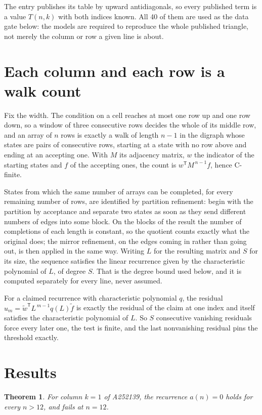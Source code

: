 \documentclass[11pt]{article}
\newtheorem{theorem}{Theorem}
\theoremstyle{definition}
\begin{document}
The entry publishes its table by upward antidiagonals, so every published term is a value $T(n,k)$ with both indices known. All 40 of them are used as the data gate below: the models are required to reproduce the whole published triangle, not merely the column or row a given line is about.

\section{Each column and each row is a walk count}

Fix the width. The condition on a cell reaches at most one row up and one row down, so a window of three consecutive rows decides the whole of its middle row, and an array of $n$ rows is exactly a walk of length $n-1$ in the digraph whose states are pairs of consecutive rows, starting at a state with no row above and ending at an accepting one. With $M$ its adjacency matrix, $w$ the indicator of the starting states and $f$ of the accepting ones, the count is $w^{\mathsf T}M^{\,n-1}f$, hence C-finite.

States from which the same number of arrays can be completed, for every remaining number of rows, are identified by partition refinement: begin with the partition by acceptance and separate two states as soon as they send different numbers of edges into some block. On the blocks of the result the number of completions of each length is constant, so the quotient counts exactly what the original does; the mirror refinement, on the edges coming in rather than going out, is then applied in the same way. Writing $L$ for the resulting matrix and $S$ for its size, the sequence satisfies the linear recurrence given by the characteristic polynomial of $L$, of degree $S$. That is the degree bound used below, and it is computed separately for every line, never assumed.

For a claimed recurrence with characteristic polynomial $q$, the residual $u_m = \tilde w^{\mathsf T}L^{\,m-1}q(L)\tilde f$ is exactly the residual of the claim at one index and itself satisfies the characteristic polynomial of $L$. So $S$ consecutive vanishing residuals force every later one, the test is finite, and the last nonvanishing residual pins the threshold exactly.

\section{Results}

\begin{theorem} For column $k = 1$ of A252139, the recurrence $a(n) = 0$ holds for every $n > 12$, and fails at $n = 12$.\end{theorem}
\end{document}
